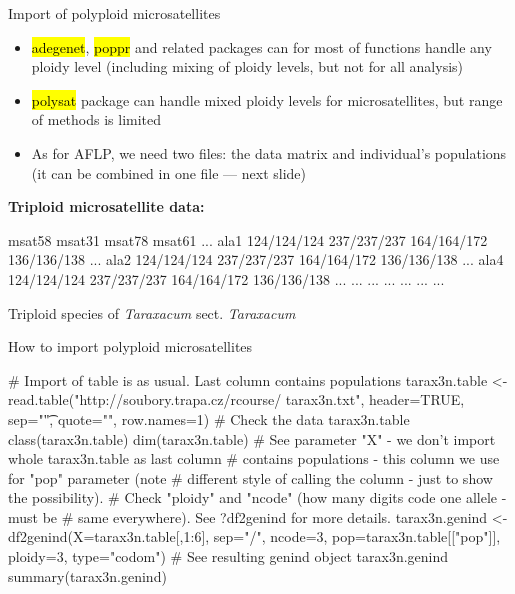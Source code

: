 \documentclass[compress, ucs, xelatex, 11pt, xcolor=svgnames,
  hyperref={
    bookmarks=true,
    unicode=true,
    colorlinks=true,
    pdftitle={Molecular data in R},
    plainpages=false,
    pdfauthor={Vojtech Zeisek},
    pdfsubject={Course about phylogeny and evolution in R},
    pdfcreator={XeLaTeX},
    pdfkeywords={R, evolution, phylogeny, molecular data},
    linkcolor=Tomato,
    anchorcolor=SaddleBrown,
    citecolor=Goldenrod,
    filecolor=DarkMagenta,
    menucolor=Sienna,
    urlcolor=DarkTurquoise,
    pdftex},
  url={hyphens, lowtilde} %
  ]{beamer}
\renewcommand{\texttt}[1]{\hl{\ttfamily #1}}
\begin{document}
\begin{frame}[fragile]{Import of polyploid microsatellites}
  \vfill
  \begin{itemize}
    \item \texttt{adegenet}, \texttt{poppr} and related packages can for most of functions handle any ploidy level (including mixing of ploidy levels, but not for all analysis)
    \item \texttt{polysat} package can handle mixed ploidy levels for microsatellites, but range of methods is limited
    \item As for AFLP, we need two files: the data matrix and individual's populations (it can be combined in one file --- next slide)
  \end{itemize}
  \vfill
  \textbf{Triploid microsatellite data:}
  \vfil
  \begin{spluscode}
              msat58      msat31      msat78      msat61 ...
    ala1 124/124/124 237/237/237 164/164/172 136/136/138 ...
    ala2 124/124/124 237/237/237 164/164/172 136/136/138 ...
    ala4 124/124/124 237/237/237 164/164/172 136/136/138 ...
     ...         ...         ...         ...         ... ...
  \end{spluscode}
  \vfill
  \begin{footnotesize}
    Triploid species of \textit{Taraxacum} sect. \textit{Taraxacum}
  \end{footnotesize}
  \vfill
\end{frame}

\begin{frame}[fragile]{How to import polyploid microsatellites}
  \begin{spluscode}
    # Import of table is as usual. Last column contains populations
    tarax3n.table <- read.table("http://soubory.trapa.cz/rcourse/
      tarax3n.txt", header=TRUE, sep="\t", quote="", row.names=1)
    # Check the data
    tarax3n.table
    class(tarax3n.table)
    dim(tarax3n.table)
    # See parameter "X" - we don't import whole tarax3n.table as last column
    # contains populations - this column we use for "pop" parameter (note
    # different style of calling the column - just to show the possibility).
    # Check "ploidy" and "ncode" (how many digits code one allele - must be
    # same everywhere). See ?df2genind for more details.
    tarax3n.genind <- df2genind(X=tarax3n.table[,1:6], sep="/", ncode=3,
      pop=tarax3n.table[["pop"]], ploidy=3, type="codom")
    # See resulting genind object
    tarax3n.genind
    summary(tarax3n.genind)
  \end{spluscode}
\end{frame}
\end{document}

